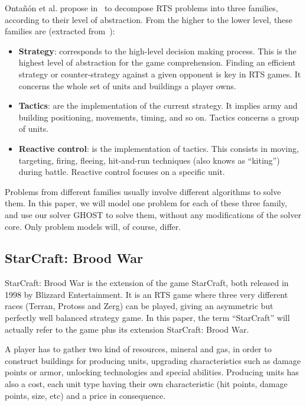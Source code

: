 \documentclass[journal]{IEEEtran}
\newcommand{\ghost}{\textsc{GHOST}\xspace}
\begin{document}
Onta{\~n}{\'o}n et  al. propose in~\cite{OntanonSURCM13}  to decompose
RTS  problems  into  three  families,  according  to  their  level  of
abstraction. From  the higher to  the lower level, these  families are
(extracted from~\cite{OntanonSURCM13}):
\begin{itemize}
\item {\bf  Strategy}: corresponds  to the high-level  decision making
  process.   This is  the highest  level of  abstraction for  the game
  comprehension.   Finding an  efficient strategy  or counter-strategy
  against a given opponent is key  in RTS games. It concerns the whole
  set of units and buildings a player owns.
\item {\bf Tactics}:  are the implementation of  the current strategy.
  It implies army and building  positioning, movements, timing, and so
  on. Tactics concerns a group of units.
\item {\bf Reactive  control}: is the implementation  of tactics. This
  consists   in  moving,   targeting,  firing,   fleeing,  hit-and-run
  techniques  (also  knows  as ``kiting'')  during  battle.   Reactive
  control focuses on a specific unit.
\end{itemize}
Problems from different families  usually involve different algorithms
to solve them.  In  this paper, we will model one  problem for each of
these three family,  and use our solver \ghost to  solve them, without
any modifications  of the  solver core. Only  problem models  will, of
course, differ.

\subsection{StarCraft: Brood War}

StarCraft:  Brood War  is the  extension of  the game  StarCraft, both
released in 1998  by Blizzard Entertainment.  It is an  RTS game where
three very different  races (Terran, Protoss and Zerg)  can be played,
giving an  asymmetric but perfectly  well balanced strategy  game.  In
this paper,  the term  ``StarCraft'' will actually  refer to  the game
plus its extension StarCraft: Brood War.

A player  has to  gather two  kind of resources,  mineral and  gas, in
order   to  construct   buildings  for   producing  units,   upgrading
characteristics such as damage points or armor, unlocking technologies
and special abilities. Producing units has also a cost, each unit type
having their own characteristic (hit points, damage points, size, etc)
and a price in consequence.
\end{document}
